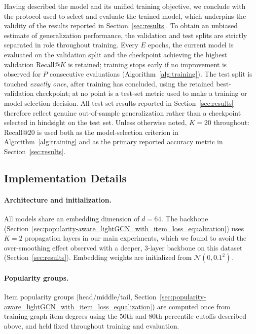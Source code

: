Having described the model and its unified training objective, we conclude with the protocol
used to select and evaluate the trained model, which underpins the validity of the results
reported in Section~\ref{sec:results}. To obtain an unbiased estimate of generalization
performance, the validation and test splits
are strictly separated in role throughout training. Every $E$ epochs, the current model is
evaluated on the validation split and the checkpoint achieving the highest validation
Recall@$K$ is retained; training stops early if no improvement is observed for $P$ consecutive
evaluations (Algorithm~\ref{alg:training}). The test split is touched \emph{exactly once},
after training has concluded, using the retained best-validation checkpoint; at no point is a
test-set metric used to make a training or model-selection decision. All test-set results
reported in Section~\ref{sec:results} therefore reflect genuine out-of-sample generalization
rather than a checkpoint selected in hindsight on the test set. Unless otherwise noted,
$K=20$ throughout: Recall@20 is used both as the model-selection criterion in
Algorithm~\ref{alg:training} and as the primary reported accuracy metric in Section~\ref{sec:results}.

\subsection{Implementation Details}
\label{sec:implementation_details}

\paragraph{Architecture and initialization.}
All models share an embedding dimension of $d=64$. The backbone
(Section~\ref{sec:popularity-aware_lightGCN_with_item_loss_equalization}) uses $K=2$
propagation layers in our main experiments, which we found to avoid the over-smoothing effect
observed with a deeper, 3-layer backbone on this dataset (Section~\ref{sec:results}). Embedding
weights are initialized from $\mathcal{N}(0, 0.1^2)$.

\paragraph{Popularity groups.}
Item popularity groups (head/middle/tail,
Section~\ref{sec:popularity-aware_lightGCN_with_item_loss_equalization}) are computed once
from training-graph item degrees using the 50th and 80th percentile cutoffs described above,
and held fixed throughout training and evaluation.

